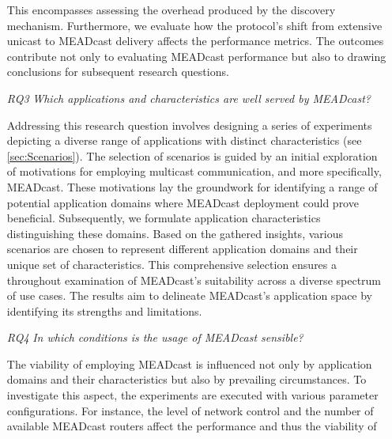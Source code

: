 \begin{itemize}
        This encompasses assessing the overhead produced by the discovery
            mechanism.
        Furthermore, we evaluate how the protocol's shift from extensive
            unicast to MEADcast delivery affects the performance metrics.
        The outcomes contribute not only to evaluating MEADcast performance but
            also to drawing conclusions for subsequent research questions.
    \item[\textit{RQ3}]
        \textit{Which applications and characteristics are well served by
        MEADcast?}\par
        Addressing this research question involves designing a series of 
            experiments depicting a diverse range of applications with distinct
            characteristics (see \autoref{sec:Scenarios}).
        The selection of scenarios is guided by an initial exploration of
            motivations for employing multicast communication, and more
            specifically, MEADcast.
        These motivations lay the groundwork for identifying a range of
            potential application domains where MEADcast deployment could prove
            beneficial.
        Subsequently, we formulate application characteristics distinguishing
            these domains.
        Based on the gathered insights, various scenarios are chosen to
            represent different application domains and their unique set of
            characteristics.
        This comprehensive selection ensures a throughout examination of
            MEADcast's suitability across a diverse spectrum of use cases.
        The results aim to delineate MEADcast's application space by
            identifying its strengths and limitations.
    \item[\textit{RQ4}]
        \textit{In which conditions is the usage of MEADcast sensible?}\par
        The viability of employing MEADcast is influenced not only by
            application domains and their characteristics but also by
            prevailing circumstances.
        To investigate this aspect, the experiments are executed with various
            parameter configurations.
        For instance, the level of network control and the number of available
            MEADcast routers affect the performance and thus the viability of

\end{itemize}
